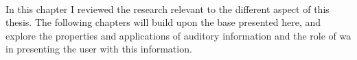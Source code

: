 \paragraph[Bridge]{}
In this chapter I reviewed the research relevant to the different aspect of this thesis. The following chapters will build upon the base presented here, and explore the properties and applications of auditory information and the role of \gls{wa} in presenting the user with this information.

